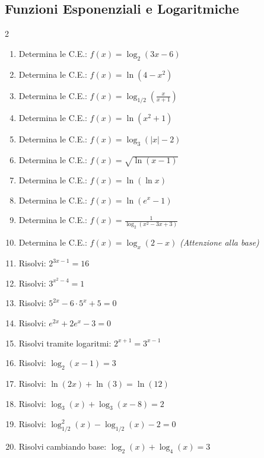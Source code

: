 \subsection{Funzioni Esponenziali e Logaritmiche}
\begin{multicols}{2}
\begin{enumerate}
    \item {} Determina le C.E.: $f(x) = \log_2(3x - 6)$
    \item {} Determina le C.E.: $f(x) = \ln(4 - x^2)$
    \item {} Determina le C.E.: $f(x) = \log_{1/2}\left(\frac{x}{x+1}\right)$
    \item {} Determina le C.E.: $f(x) = \ln(x^2 + 1)$
    \item {} Determina le C.E.: $f(x) = \log_3(|x| - 2)$
    \item {} Determina le C.E.: $f(x) = \sqrt{\ln(x - 1)}$
    \item {} Determina le C.E.: $f(x) = \ln(\ln x)$
    \item {} Determina le C.E.: $f(x) = \ln(e^x - 1)$
    \item {} Determina le C.E.: $f(x) = \frac{1}{\log_2(x^2 - 3x + 3)}$
    \item {} Determina le C.E.: $f(x) = \log_x(2 - x)$ \textit{(Attenzione alla base)}
    
    \item {} Risolvi: $2^{3x-1} = 16$
    \item {} Risolvi: $3^{x^2 - 4} = 1$
    \item {} Risolvi: $5^{2x} - 6 \cdot 5^x + 5 = 0$
    \item {} Risolvi: $e^{2x} + 2e^x - 3 = 0$
    \item {} Risolvi tramite logaritmi: $2^{x+1} = 3^{x-1}$
    \item {} Risolvi: $\log_2(x-1) = 3$
    \item {} Risolvi: $\ln(2x) + \ln(3) = \ln(12)$
    \item {} Risolvi: $\log_3(x) + \log_3(x-8) = 2$
    \item {} Risolvi: $\log_{1/2}^2(x) - \log_{1/2}(x) - 2 = 0$
    \item {} Risolvi cambiando base: $\log_2(x) + \log_4(x) = 3$
    

\end{enumerate}
\end{multicols}
